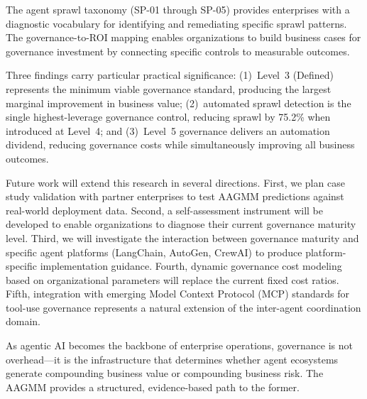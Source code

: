 \documentclass[ai,article,submit,pdftex,moreauthors]{Definitions/mdpi}
\begin{document}
The agent sprawl taxonomy (SP-01 through SP-05) provides enterprises with a diagnostic vocabulary for identifying and remediating specific sprawl patterns. The governance-to-ROI mapping enables organizations to build business cases for governance investment by connecting specific controls to measurable outcomes.

Three findings carry particular practical significance: (1)~Level~3 (Defined) represents the minimum viable governance standard, producing the largest marginal improvement in business value; (2)~automated sprawl detection is the single highest-leverage governance control, reducing sprawl by 75.2\% when introduced at Level~4; and (3)~Level~5 governance delivers an automation dividend, reducing governance costs while simultaneously improving all business outcomes.

Future work will extend this research in several directions. First, we plan case study validation with partner enterprises to test AAGMM predictions against real-world deployment data. Second, a self-assessment instrument will be developed to enable organizations to diagnose their current governance maturity level. Third, we will investigate the interaction between governance maturity and specific agent platforms (LangChain, AutoGen, CrewAI) to produce platform-specific implementation guidance. Fourth, dynamic governance cost modeling based on organizational parameters will replace the current fixed cost ratios. Fifth, integration with emerging Model Context Protocol (MCP) standards for tool-use governance represents a natural extension of the inter-agent coordination domain.

As agentic AI becomes the backbone of enterprise operations, governance is not overhead---it is the infrastructure that determines whether agent ecosystems generate compounding business value or compounding business risk. The AAGMM provides a structured, evidence-based path to the former.


\vspace{6pt}


\end{document}
